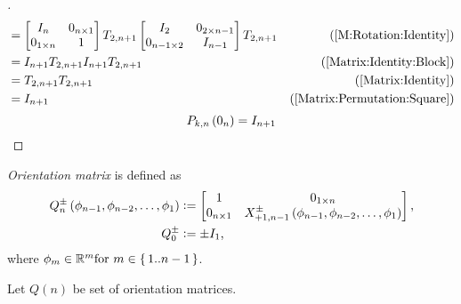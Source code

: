 \documentclass[stu, babel, american, biblatex, a4paper, leqno, draftall]{apa7}
\begin{document}
\begin{proof}[]
\begin{align*}
		&=
		\begin{bmatrix}
            I_{n} & 0_{n\times 1} \\
            0_{1\times n}                                                                                      & 1 \\
        \end{bmatrix}
        T_{2, n+1}
        \begin{bmatrix}
            I_{2} & 0_{{2}\times{n-1}} \\
            0_{{n-1}\times{2}}                                   & {I}_{n-1} \\
        \end{bmatrix}
        T_{2, n+1} & \text{(\cref{M:Rotation:Identity})} \\
		&=
		I_{n+1}
        T_{2, n+1}
        I_{n+1}
        T_{2, n+1} & \text{(\cref{Matrix:Identity:Block})} \\
		&=
        T_{2, n+1}
        T_{2, n+1} & \text{(\cref{Matrix:Identity})} \\
		&=
        I_{n+1} & \text{(\cref{Matrix:Permutation:Square})}
	\end{align*}
    \begin{equation*}
    	P_{k,n}
    	\left(0_{n}\right)
    	=
    	I_{n+1}
        \qedhere
    \end{equation*}
\end{proof}
\begin{definition}\label{M:Orientation}
    \textit{Orientation matrix} is defined as
    \begin{align*}
        Q^\pm_n\left(\phi_{n-1},\phi_{n-2},\dots,\phi_1\right) & \vcentcolon=
        \begin{bmatrix}
            1 & 0_{1\times n}                                                             \\
            0_{n\times 1} & X^\pm_{+1,n-1}\left(\phi_{n-1},\phi_{n-2},\dots,\phi_1\right) \\
        \end{bmatrix}\text{,}                                              \\
        Q^\pm_0                                                & \vcentcolon= \pm I_1\text{,}
    \end{align*}
    where $\phi_m\in\mathbb{R}^m \text{for } m\in\set{1..n-1}$.
\end{definition}
\begin{definition}\label{M:Orientation:Set}
    Let $Q\left(n\right)$ be set of orientation matrices.
\end{definition}
\end{document}
